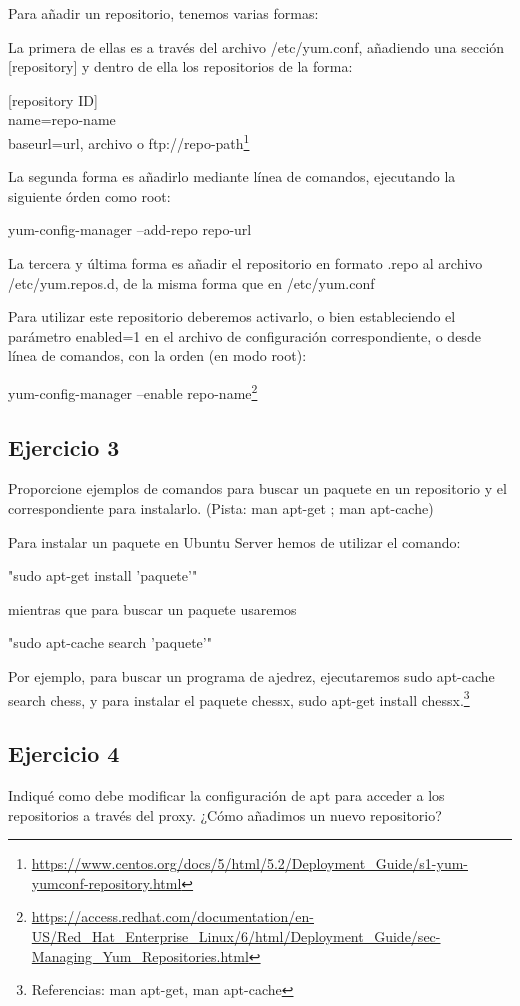 \documentclass[a4paper, 11pt]{article} %
\begin{document}
Para añadir un repositorio, tenemos varias formas: 

	La primera de ellas es a través del archivo /etc/yum.conf, añadiendo una sección [repository] y dentro de ella los repositorios de la forma: 

	[repository ID]\\
	name=repo-name\\
	baseurl=url, archivo o ftp://repo-path\footnote{\url{https://www.centos.org/docs/5/html/5.2/Deployment_Guide/s1-yum-yumconf-repository.html}}
	
	La segunda forma es añadirlo mediante línea de comandos, ejecutando la siguiente órden como root: 
	
	yum-config-manager --add-repo repo-url

	La tercera y última forma es añadir el repositorio en formato .repo al archivo /etc/yum.repos.d, de la misma forma que en /etc/yum.conf 
	
	Para utilizar este repositorio deberemos activarlo, o bien estableciendo el parámetro enabled=1 en el archivo de configuración correspondiente, o desde línea de comandos, con la orden (en modo root):
	
	yum-config-manager --enable repo-name\footnote{\url{https://access.redhat.com/documentation/en-US/Red_Hat_Enterprise_Linux/6/html/Deployment_Guide/sec-Managing_Yum_Repositories.html}} 
	

\subsection{Ejercicio 3}
Proporcione ejemplos de comandos para buscar un paquete en un
repositorio y el correspondiente para instalarlo. (Pista: man apt-get ; man apt-cache)

Para instalar un paquete en Ubuntu Server hemos de utilizar el comando: 

"sudo apt-get install 'paquete'" 

mientras que para buscar un paquete usaremos 

"sudo apt-cache search 'paquete'" 

Por ejemplo, para buscar un programa de ajedrez, ejecutaremos sudo apt-cache search chess, y para instalar el paquete chessx, sudo apt-get install chessx.\footnote{Referencias: man apt-get, man apt-cache}

\subsection{Ejercicio 4}
Indiqué como debe modificar la configuración de apt para acceder a los repositorios a través del proxy. ¿Cómo añadimos un nuevo repositorio?
\end{document}
